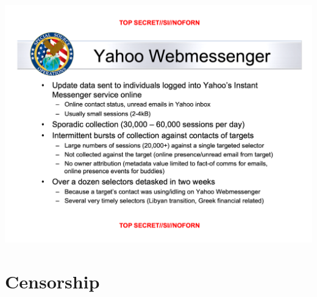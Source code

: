 \documentclass[nobackground,dvipsnames,table,aspectratio=169]{beamer}
\begin{document}
\begin{frame}{}
    \thispagestyle{empty}
\end{frame}

\begin{frame}{}
    \centering
    \includegraphics[height=0.9\textheight]{prism-yahoo-webmessenger}
\end{frame}

\section{Censorship}
\end{document}
